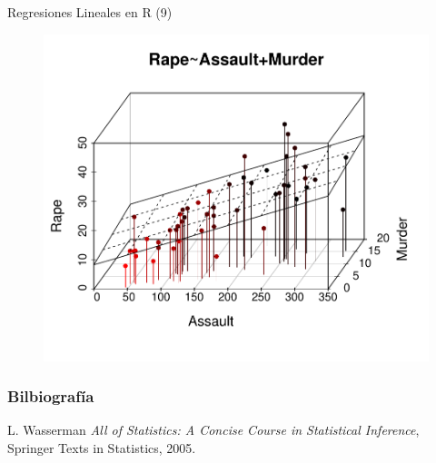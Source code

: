 \documentclass[handout]{beamer}
\begin{document}
\begin{frame}{Regresiones Lineales en R (9)}
 
\begin{figure}[h!]
	\centering
	\includegraphics[scale=0.6]{pics/reg3d.pdf}
\end{figure}
 
\end{frame}

\begin{frame}[allowframebreaks]\scriptsize
\frametitle{Bilbiografía}
\begin{thebibliography}{8}

L. Wasserman \emph{All of Statistics: A Concise Course in Statistical Inference}, Springer Texts in Statistics, 2005.
\end{thebibliography}


\end{frame}




\end{document}
